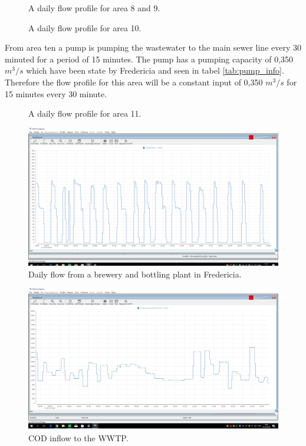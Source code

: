 \begin{figure}[H]
\centering

\caption{A daily flow profile for area 8 and 9.}
\label{fig:APP_flow_profile_zone8_9}
\end{figure} 

\begin{figure}[H]
\centering

\caption{A daily flow profile for area 10.}
\label{fig:APP_flow_profile_zone10}
\end{figure} 

From area ten a pump is pumping the wastewater to the main sewer line every 30 minuted for a period of 15 minutes. The pump has a pumping capacity of 0,350 $m^3/s$ which have been state by Fredericia and seen in tabel \ref{tab:pump_info}. Therefore the flow profile for this area will be a constant input of 0,350 $m^3/s$ for 15 minutes every 30 minute. 

\begin{figure}[H]
\centering

\caption{A daily flow profile for area 11.}
\label{fig:APP_flow_profile_zone11}
\end{figure} 


\begin{figure}[H]
	\centering
	\includegraphics[width=0.95\textheight, angle=-90]{report/appendix/figures/Carlsberg_data.png}
	\caption{Daily flow from a brewery and bottling plant in Fredericia.}
	\label{fig:Carlsberg_data}
\end{figure}

\begin{figure}[H]
	\centering
	\includegraphics[width=0.95\textheight, angle=-90]{report/appendix/figures/COD_data.png}
	\caption{COD inflow to the WWTP.}
	\label{fig:COD_data}
\end{figure}

